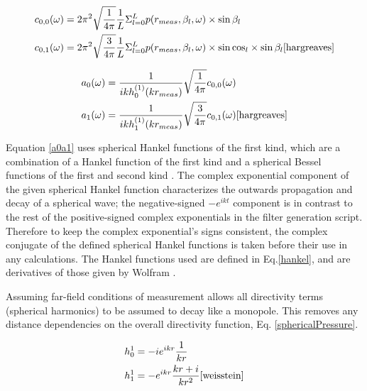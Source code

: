 \documentclass{report}
\begin{document}
            \begin{equation}
                \begin{split}
                    c_{0,0}(\omega) &= 2\pi^2 \sqrt{\frac{1}{4\pi}}\frac{1}{L}\Sigma_{l=0}^L p(r_{meas},\beta_l,\omega) \times \sin{\beta_l} \\
                    c_{0,1}(\omega) &= 2\pi^2 \sqrt{\frac{3}{4\pi}}\frac{1}{L}\Sigma_{l=0}^L p(r_{meas},\beta_l,\omega) \times \sin{\cos_l} \times \sin{\beta_l}
                    \label{cIntegral}\cite{hargreaves}
                \end{split}
            \end{equation}
            
            \begin{equation}
                \begin{split}
                    a_0(\omega) &= \frac{1}{ikh_0^{(1)}(kr_{meas})} \sqrt{\frac{1}{4\pi}} c_{0,0}(\omega) \\
                    a_1(\omega) &= \frac{1}{ikh_1^{(1)}(kr_{meas})} \sqrt{\frac{3}{4\pi}} c_{0,1}(\omega)
                    \label{a0a1}\cite{hargreaves}
                \end{split}
            \end{equation}

            Equation \ref{a0a1} uses spherical Hankel functions of the first kind, which are a combination of a Hankel function of the first kind and a spherical Bessel functions of the first and second kind \cite{weisstein}.
            The complex exponential component of the given spherical Hankel function characterizes the outwards propagation and decay of a spherical wave; the negative-signed $-e^{ikt}$ component is in contrast to the rest of the positive-signed complex exponentials in the filter generation script.
            Therefore to keep the complex exponential's signs consistent, the complex conjugate of the defined spherical Hankel functions is taken before their use in any calculations.
            The Hankel functions used are defined in Eq.\ref{hankel}, and are derivatives of those given by Wolfram \cite{weisstein}.

            Assuming far-field conditions of measurement allows all directivity terms (spherical harmonics) to be assumed to decay like a monopole.
            This removes any distance dependencies on the overall directivity function, Eq. \ref{sphericalPressure}.

            \begin{equation}
                \begin{split}
                    h_0^1 &= -i  e^{ikr}  \frac{1}{kr} \\
                    h_1^1 &= -e^{ikr}  \frac{kr + i}{kr^2}
                    \label{hankel} \cite{weisstein}
                \end{split}
            \end{equation}
\end{document}
